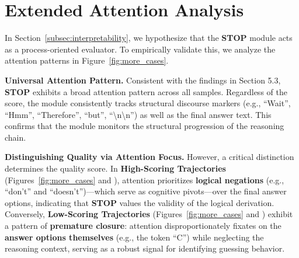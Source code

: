 \documentclass[11pt]{article}
\theoremstyle{plain}
\begin{document}
  




\section{Extended Attention Analysis}
\label{app:mechanistic_interpretability}

In Section~\ref{subsec:interpretability}, we hypothesize that the \textbf{STOP} module acts as a process-oriented evaluator. To empirically validate this, we analyze the attention patterns in Figure~\ref{fig:more_cases}.


\noindent\textbf{Universal Attention Pattern.}
Consistent with the findings in Section 5.3, \textbf{STOP} exhibits a broad attention pattern across all samples. Regardless of the score, the module consistently tracks structural discourse markers (e.g., ``Wait'', ``Hmm'', ``Therefore'', ``but'', ``\textbackslash n\textbackslash n'') as well as the final answer text. This confirms that the module monitors the structural progression of the reasoning chain.


\noindent\textbf{Distinguishing Quality via Attention Focus.}
However, a critical distinction determines the quality score.
In \textbf{High-Scoring Trajectories} (Figures~\ref{fig:more_cases} and ), attention prioritizes \textbf{logical negations} (e.g., ``don't'' and ``doesn't'')—which serve as cognitive pivots—over the final answer options, indicating that \textbf{STOP} values the validity of the logical derivation.
Conversely, \textbf{Low-Scoring Trajectories} (Figures~\ref{fig:more_cases} and ) exhibit a pattern of \textbf{premature closure}: attention disproportionately fixates on the \textbf{answer options themselves} (e.g., the token ``C'') while neglecting the reasoning context, serving as a robust signal for identifying guessing behavior.
\end{document}
